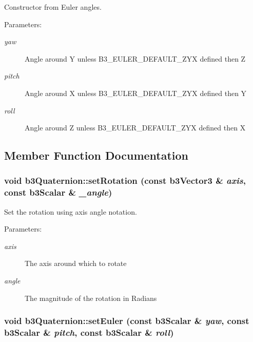 Constructor from Euler angles. 

\begin{Desc}
\item[Parameters:]
\begin{description}
\item[{\em yaw}]Angle around Y unless B3\_\-EULER\_\-DEFAULT\_\-ZYX defined then Z \item[{\em pitch}]Angle around X unless B3\_\-EULER\_\-DEFAULT\_\-ZYX defined then Y \item[{\em roll}]Angle around Z unless B3\_\-EULER\_\-DEFAULT\_\-ZYX defined then X \end{description}
\end{Desc}


\subsection{Member Function Documentation}
\hypertarget{classb3_quaternion_af98a2aed426d63aacf993c354bb4571}{
\subsubsection[setRotation]{\setlength{\rightskip}{0pt plus 5cm}void b3Quaternion::setRotation (const b3Vector3 \& {\em axis}, \/  const b3Scalar \& {\em \_\-angle})}}
\label{classb3_quaternion_af98a2aed426d63aacf993c354bb4571}


Set the rotation using axis angle notation. 

\begin{Desc}
\item[Parameters:]
\begin{description}
\item[{\em axis}]The axis around which to rotate \item[{\em angle}]The magnitude of the rotation in Radians \end{description}
\end{Desc}
\hypertarget{classb3_quaternion_497ec9be887735d3655eb5f64bfb45bb}{
\subsubsection[setEuler]{\setlength{\rightskip}{0pt plus 5cm}void b3Quaternion::setEuler (const b3Scalar \& {\em yaw}, \/  const b3Scalar \& {\em pitch}, \/  const b3Scalar \& {\em roll})}}
\label{classb3_quaternion_497ec9be887735d3655eb5f64bfb45bb}


